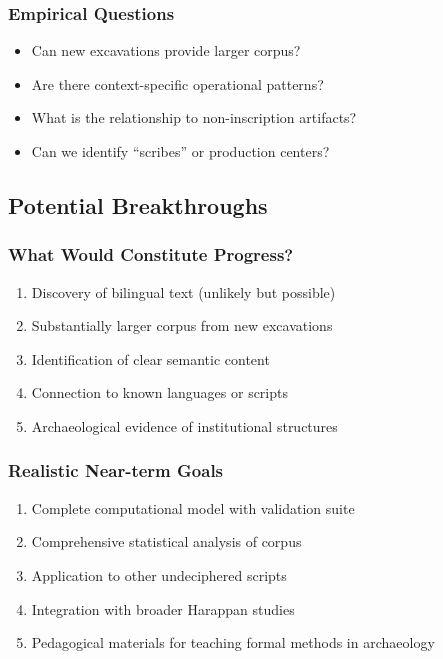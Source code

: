 \subsubsection{Empirical Questions}
\begin{itemize}
    \item Can new excavations provide larger corpus?
    \item Are there context-specific operational patterns?
    \item What is the relationship to non-inscription artifacts?
    \item Can we identify ``scribes'' or production centers?
\end{itemize}

\subsection{Potential Breakthroughs}

\subsubsection{What Would Constitute Progress?}
\begin{enumerate}
    \item Discovery of bilingual text (unlikely but possible)
    \item Substantially larger corpus from new excavations
    \item Identification of clear semantic content
    \item Connection to known languages or scripts
    \item Archaeological evidence of institutional structures
\end{enumerate}

\subsubsection{Realistic Near-term Goals}
\begin{enumerate}
    \item Complete computational model with validation suite
    \item Comprehensive statistical analysis of corpus
    \item Application to other undeciphered scripts
    \item Integration with broader Harappan studies
    \item Pedagogical materials for teaching formal methods in archaeology
\end{enumerate}

